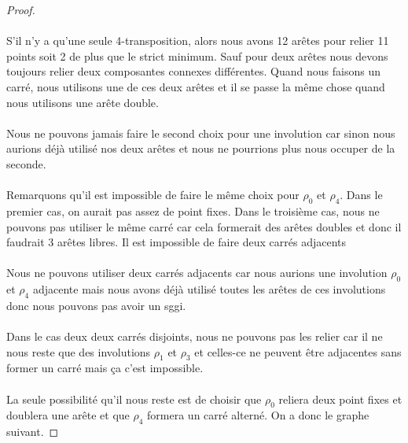\begin{proof}
\paragraph{}
S'il n'y a qu'une seule 4-transposition, alors nous avons 12 arêtes pour relier 11 points soit 2 de plus que le strict minimum. Sauf pour deux arêtes nous devons toujours relier deux composantes connexes différentes. Quand nous faisons un carré, nous utilisons une de ces deux arêtes et il se passe la même chose quand nous utilisons une arête double.

\paragraph{}
Nous ne pouvons jamais faire le second choix pour une involution car sinon nous aurions déjà utilisé nos deux arêtes et nous ne pourrions plus nous occuper de la seconde.

\paragraph{}
Remarquons qu'il est impossible de faire le même choix pour $\rho_0$ et $\rho_4$. Dans le premier cas, on aurait pas assez de point fixes. Dans le troisième cas, nous ne pouvons pas utiliser le même carré car cela formerait des arêtes doubles et donc il faudrait 3 arêtes libres. Il est impossible de faire deux carrés adjacents

\paragraph{}
Nous ne pouvons utiliser deux carrés adjacents car nous aurions une involution $\rho_0$ et $\rho_4$ adjacente mais nous avons déjà utilisé toutes les arêtes de ces involutions donc nous pouvons pas avoir un sggi.

\paragraph{}
Dans le cas deux deux carrés disjoints, nous ne pouvons pas les relier car il ne nous reste que des involutions $\rho_1$ et $\rho_3$ et celles-ce ne peuvent être adjacentes sans former un carré mais ça c'est impossible.

\paragraph{}
La seule possibilité qu'il nous reste est de choisir que $\rho_0$ reliera deux point fixes et doublera une arête et que $\rho_4$ formera un carré alterné. On a donc le graphe suivant.



\end{proof}
